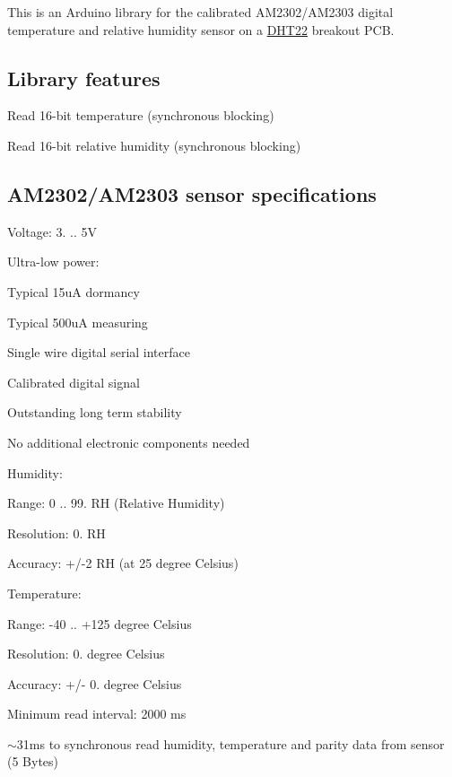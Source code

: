 \href{https://travis-ci.org/Erriez/ErriezDHT22}{\tt }

This is an Arduino library for the calibrated A\+M2302/\+A\+M2303 digital temperature and relative humidity sensor on a \hyperlink{class_d_h_t22}{D\+H\+T22} breakout P\+CB.



\subsection*{Library features}


\begin{DoxyItemize}
\item Read 16-\/bit temperature (synchronous blocking)
\item Read 16-\/bit relative humidity (synchronous blocking)
\end{DoxyItemize}

\subsection*{A\+M2302/\+A\+M2303 sensor specifications}


\begin{DoxyItemize}
\item Voltage\+: 3. .. 5V
\item Ultra-\/low power\+:
\begin{DoxyItemize}
\item Typical 15uA dormancy
\item Typical 500uA measuring
\end{DoxyItemize}
\item Single wire digital serial interface
\item Calibrated digital signal
\item Outstanding long term stability
\item No additional electronic components needed
\item Humidity\+:
\begin{DoxyItemize}
\item Range\+: 0 .. 99. RH (Relative Humidity)
\item Resolution\+: 0. RH
\item Accuracy\+: +/-\/2 RH (at 25 degree Celsius)
\end{DoxyItemize}
\item Temperature\+:
\begin{DoxyItemize}
\item Range\+: -\/40 .. +125 degree Celsius
\item Resolution\+: 0. degree Celsius
\item Accuracy\+: +/-\/ 0. degree Celsius
\end{DoxyItemize}
\item Minimum read interval\+: 2000 ms
\item $\sim$31ms to synchronous read humidity, temperature and parity data from sensor (5 Bytes)
\end{DoxyItemize}

